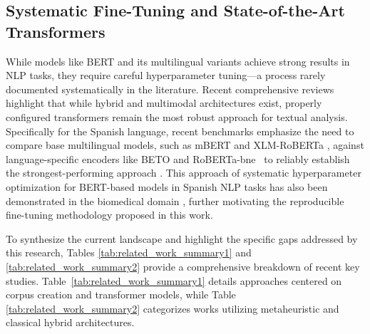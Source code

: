 \documentclass[informatics,article,accept,pdftex,moreauthors]{Definitions/mdpi}
\begin{document}
\subsection{Systematic Fine-Tuning and State-of-the-Art Transformers}
While models like BERT and its multilingual variants achieve strong results in NLP tasks, they require careful hyperparameter tuning—a process rarely documented systematically in the literature. Recent comprehensive reviews \citep{singh2024comprehensive, alghamdi2024comprehensive} highlight that while hybrid and multimodal architectures exist, properly configured transformers \citep{rout2025reliable} remain the most robust approach for textual analysis. Specifically for the Spanish language, recent benchmarks emphasize the need to compare base multilingual models, such as mBERT \citep{devlin2018bert} and XLM-RoBERTa \citep{conneau2019unsupervised}, against language-specific encoders like BETO \citep{canete2020spanish} and \mbox{RoBERTa-bne \citep{gutierrez2022roberta}} to reliably establish the strongest-performing approach \citep{blanco2024enhancing}. This approach of systematic hyperparameter optimization for BERT-based models in Spanish NLP tasks has also been demonstrated in the biomedical domain \citep{padilla2024medicobert}, further motivating the reproducible fine-tuning methodology proposed in this work.

To synthesize the current landscape and highlight the specific gaps addressed by this research, Tables \ref{tab:related_work_summary1} and \ref{tab:related_work_summary2} provide a comprehensive breakdown of recent key studies. \mbox{Table \ref{tab:related_work_summary1}} details approaches centered on corpus creation and transformer models, while Table \ref{tab:related_work_summary2} categorizes works utilizing metaheuristic and classical hybrid architectures.
\end{document}
